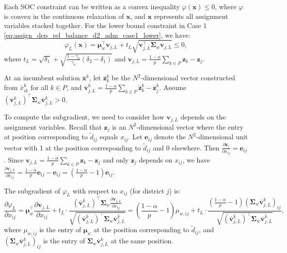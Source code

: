 \documentclass[preprint,12pt,authoryear]{elsarticle}
\begin{document}
Each SOC constraint can be written as a convex inequality $\varphi(\mathbf{x}) \leqslant 0$, where $\varphi$ is convex in the continuous relaxation of $\mathbf{x}$, and $\mathbf{x}$ represents all assignment variables stacked together. For the lower bound constraint in Case 1 \eqref{eq:assign_dep_rel_balance_d2_adm_case1_lower}, we have:
\begin{equation}
\varphi_L(\mathbf{x}) = \boldsymbol{\mu}_w^\top \mathbf{v}_{j,L} + t_L \sqrt{\mathbf{v}_{j,L}^\top \boldsymbol{\Sigma}_w \mathbf{v}_{j,L}} \leqslant 0,
\end{equation}
where $t_L = \sqrt{\delta_1} + \sqrt{\frac{1 - \gamma_a}{\gamma_a} (\delta_2 - \delta_1)}$ and $\mathbf{v}_{j,L} = \frac{1-\alpha}{p}\sum_{k \in P} \mathbf{z}_k - \mathbf{z}_j$.

At an incumbent solution $\bar{\mathbf{x}}^k$, let $\bar{\mathbf{z}}_k^k$ be the $N^2$-dimensional vector constructed from $\bar{x}_{ik}^k$ for all $k \in P$, and $\bar{\mathbf{v}}_{j,L}^k = \frac{1-\alpha}{p}\sum_{k \in P} \bar{\mathbf{z}}_k^k - \bar{\mathbf{z}}_j^k$. Assume $(\bar{\mathbf{v}}_{j,L}^k)^\top \boldsymbol{\Sigma}_w \bar{\mathbf{v}}_{j,L}^k > 0$. 

To compute the subgradient, we need to consider how $\mathbf{v}_{j,L}$ depends on the assignment variables. Recall that $\mathbf{z}_j$ is an $N^2$-dimensional vector where the entry at position corresponding to $\tilde{d}_{ij}$ equals $x_{ij}$. Let $\mathbf{e}_{ij}$ denote the $N^2$-dimensional unit vector with 1 at the position corresponding to $\tilde{d}_{ij}$ and 0 elsewhere. Then $\frac{\partial \mathbf{z}_j}{\partial x_{ij}} = \mathbf{e}_{ij}$. Since $\mathbf{v}_{j,L} = \frac{1-\alpha}{p}\sum_{k \in P} \mathbf{z}_k - \mathbf{z}_j$ and only $\mathbf{z}_j$ depends on $x_{ij}$, we have $\frac{\partial \mathbf{v}_{j,L}}{\partial x_{ij}} = \frac{1-\alpha}{p}\mathbf{e}_{ij} - \mathbf{e}_{ij} = \left(\frac{1-\alpha}{p} - 1\right)\mathbf{e}_{ij}$.

The subgradient of $\varphi_L$ with respect to $x_{ij}$ (for district $j$) is:
\begin{equation}
\frac{\partial \varphi_L}{\partial x_{ij}} = \boldsymbol{\mu}_w^\top \frac{\partial \mathbf{v}_{j,L}}{\partial x_{ij}} + t_L \cdot \frac{(\bar{\mathbf{v}}_{j,L}^k)^\top \boldsymbol{\Sigma}_w \frac{\partial \mathbf{v}_{j,L}}{\partial x_{ij}}}{\sqrt{(\bar{\mathbf{v}}_{j,L}^k)^\top \boldsymbol{\Sigma}_w \bar{\mathbf{v}}_{j,L}^k}} = \left(\frac{1-\alpha}{p} - 1\right) \mu_{w,ij} + t_L \cdot \frac{\left(\frac{1-\alpha}{p} - 1\right) (\boldsymbol{\Sigma}_w \bar{\mathbf{v}}_{j,L}^k)_{ij}}{\sqrt{(\bar{\mathbf{v}}_{j,L}^k)^\top \boldsymbol{\Sigma}_w \bar{\mathbf{v}}_{j,L}^k}},
\label{eq:assign_dep_rel_subgradient_L_ij}
\end{equation}
where $\mu_{w,ij}$ is the entry of $\boldsymbol{\mu}_w$ at the position corresponding to $\tilde{d}_{ij}$, and $(\boldsymbol{\Sigma}_w \bar{\mathbf{v}}_{j,L}^k)_{ij}$ is the entry of $\boldsymbol{\Sigma}_w \bar{\mathbf{v}}_{j,L}^k$ at the same position.
\end{document}
